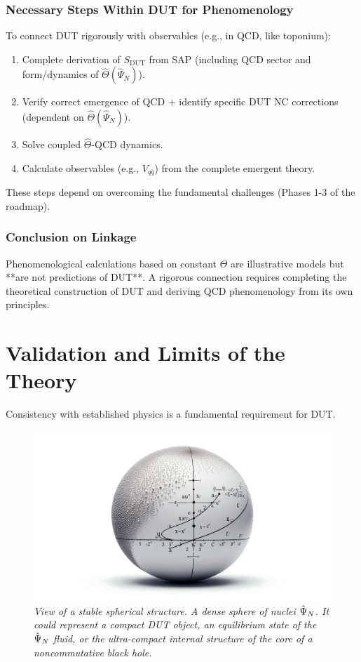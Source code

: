 \documentclass[11pt, a4paper]{article}
\theoremstyle{remark}
\newcommand{\Op}[1]{\hat{#1}}
\begin{document}
\subsubsection{Necessary Steps Within DUT for Phenomenology}
To connect DUT rigorously with observables (e.g., in QCD, like toponium):
\begin{enumerate}[label=\alph*), itemsep=0pt, topsep=2pt]
    \item Complete derivation of \( S_{\text{DUT}} \) from SAP (including QCD sector and form/dynamics of \( \Op{\Theta}(\Op{\Psi}_N) \)).
    \item Verify correct emergence of QCD + identify specific DUT NC corrections (dependent on \( \Op{\Theta}(\Op{\Psi}_N) \)).
    \item Solve coupled \( \Op{\Theta} \)-QCD dynamics.
    \item Calculate observables (e.g., \(V_{q\bar{q}}\)) from the complete emergent theory.
\end{enumerate}
These steps depend on overcoming the fundamental challenges (Phases 1-3 of the roadmap).

\subsubsection{Conclusion on Linkage}
Phenomenological calculations based on constant \( \Theta \) are illustrative models but **are not predictions of DUT**. A rigorous connection requires completing the theoretical construction of DUT and deriving QCD phenomenology from its own principles.

\section{Validation and Limits of the Theory}
\label{sec:validation_limits}

Consistency with established physics is a fundamental requirement for DUT.

\begin{figure}[htbp]
    \centering
    \includegraphics[width=0.6\linewidth]{OIG32.ZNLJ.PNG}
    \caption{%
     \footnotesize\textit{View of a stable spherical structure. A dense sphere of nuclei \(\protect\Op{\Psi}_N\). It could represent a compact DUT object, an equilibrium state of the \(\protect\Op{\Psi}_N\) fluid, or the ultra-compact internal structure of the core of a noncommutative black hole.}
    }
    \label{fig:Figura8}
\end{figure}
\end{document}
